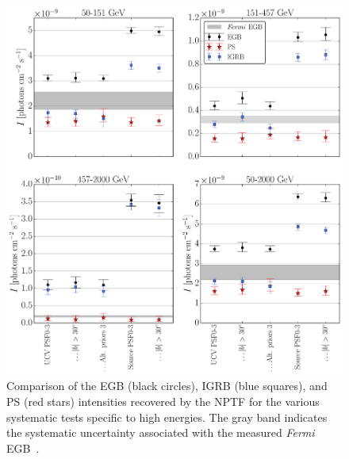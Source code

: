 \begin{figure}[!phtb] %
   \centering
   \includegraphics[width=\textwidth]{ch-igrb/plots/combined_intensities_HE_v2.pdf} 
   \caption{Comparison of the EGB (black circles), IGRB (blue squares), and PS (red stars) intensities recovered by the NPTF for the various systematic tests specific to high energies.  The gray band indicates the systematic uncertainty associated with the measured \emph{Fermi} EGB~\cite{Ackermann:2014usa}.  %
   }
   \label{fig:systematics_HE}
\end{figure}

